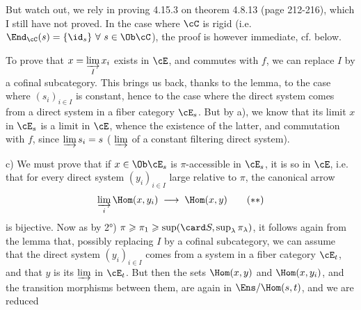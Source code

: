 But watch out, we rely in proving 4.15.3 on theorem 4.8.13 (page 212-216), which I still have not proved. In the case where $\cC$ is rigid (i.e. $\End_{\cC}(s) = \{\id_s\}\ \forall\ s \in \Ob\cC$), the proof is however immediate, cf. below.

To prove that $x = \varinjlim\limits_{I} x_i$ exists in $\cE$, and commutes with $f$, we can replace $I$ by a cofinal subcategory. This brings us back, thanks to the lemma, to the case where $(s_i)_{i\in I}$ is constant, hence to the case where the direct system comes from a direct system in a fiber category $\cE_s$. But by a), we know that its limit $x$ in $\cE_s$ is a limit in $\cE$, whence the existence of the latter, and commutation with $f$, since $\varinjlim s_i = s$ ( $\varinjlim$ of a constant filtering direct system).

c) We must prove that if $x \in \Ob\cE_s$ is $\pi$-accessible in $\cE_s$, it is so in $\cE$, i.e. that for every direct system $(y_i)_{i\in I}$ large relative to $\pi$, the canonical arrow
\[
\varinjlim_{i} \Hom(x,y_i) \;\longrightarrow\; \Hom(x,y) \tag*{$(**)$}
\]
is bijective. Now as by 2°) $\pi \geqslant \pi_1 \geqslant \sup(\card S, \sup_\lambda \pi_\lambda)$, it follows again from the lemma %
that, possibly replacing $I$ by a cofinal subcategory, we can assume that the direct system $(y_i)_{i\in I}$ comes from a system in a fiber category $\cE_t$, and that $y$ is its $\varinjlim$ in $\cE_t$. But then the sets $\Hom(x,y)$ and $\Hom(x,y_i)$, and the transition morphisms between them, are again in $\Ens/\Hom(s,t)$, and we are reduced
